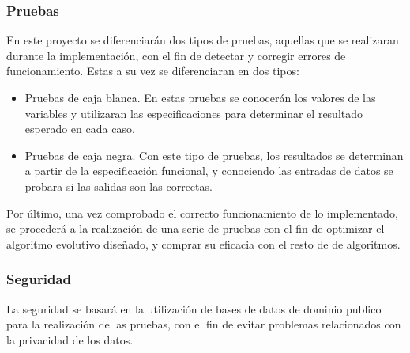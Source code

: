 \documentclass[a4paper, 12pt]{book}
\begin{document}
\subsubsection{Pruebas}
En este proyecto se diferenciarán dos tipos de pruebas, aquellas que se realizaran durante la implementación, con el fin de detectar y corregir errores de funcionamiento. Estas a su vez se diferenciaran en dos tipos:
\begin{itemize}
    \item Pruebas de caja blanca. En estas pruebas se conocerán los valores de las variables y utilizaran las especificaciones para determinar el resultado esperado en cada caso.
    \item Pruebas de caja negra. Con este tipo de pruebas, los resultados se determinan a partir de la especificación funcional, y conociendo las entradas de datos se probara si las salidas son las correctas.
\end{itemize}

Por último, una vez comprobado el correcto funcionamiento de lo implementado, se procederá a la realización de una serie de pruebas con el fin de optimizar el algoritmo evolutivo diseñado, y comprar su eficacia con el resto de de algoritmos.\\

\subsubsection{Seguridad}
La seguridad se basará en la utilización de bases de datos de dominio publico para la realización de las pruebas, con el fin de evitar problemas relacionados con la privacidad de los datos.

\newpage
\end{document}
